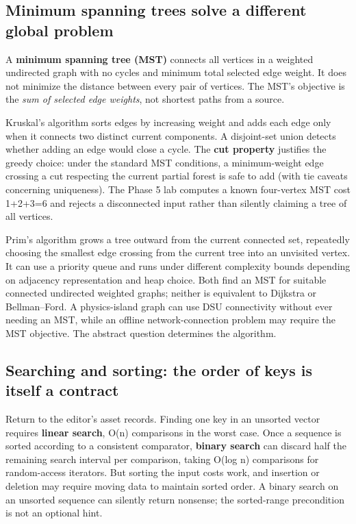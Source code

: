 \subsection{Minimum spanning trees solve a different global problem}\label{05-engine-i-ch008-minimum-spanning-trees-solve-a-different-global-problem}

A \textbf{minimum spanning tree (MST)} connects all vertices in a weighted undirected graph with no cycles and minimum total selected edge weight. It does not minimize the distance between every pair of vertices. The MST's objective is the \emph{sum of selected edge weights}, not shortest paths from a source.

Kruskal's algorithm sorts edges by increasing weight and adds each edge only when it connects two distinct current components. A disjoint-set union detects whether adding an edge would close a cycle. The \textbf{cut property} justifies the greedy choice: under the standard MST conditions, a minimum-weight edge crossing a cut respecting the current partial forest is safe to add (with tie caveats concerning uniqueness). The Phase 5 lab computes a known four-vertex MST cost 1+2+3=6 and rejects a disconnected input rather than silently claiming a tree of all vertices.

Prim's algorithm grows a tree outward from the current connected set, repeatedly choosing the smallest edge crossing from the current tree into an unvisited vertex. It can use a priority queue and runs under different complexity bounds depending on adjacency representation and heap choice. Both find an MST for suitable connected undirected weighted graphs; neither is equivalent to Dijkstra or Bellman--Ford. A physics-island graph can use DSU connectivity without ever needing an MST, while an offline network-connection problem may require the MST objective. The abstract question determines the algorithm.

\subsection{Searching and sorting: the order of keys is itself a contract}\label{05-engine-i-ch008-searching-and-sorting-the-order-of-keys-is-itself-a-contract}

Return to the editor's asset records. Finding one key in an unsorted vector requires \textbf{linear search}, O(n) comparisons in the worst case. Once a sequence is sorted according to a consistent comparator, \textbf{binary search} can discard half the remaining search interval per comparison, taking O(log n) comparisons for random-access iterators. But sorting the input costs work, and insertion or deletion may require moving data to maintain sorted order. A binary search on an unsorted sequence can silently return nonsense; the sorted-range precondition is not an optional hint.

